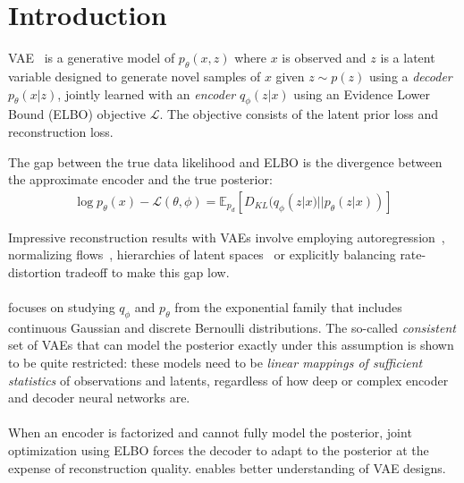 \section{Introduction}

VAE~\cite{vae} is a generative model of $p_\theta(x,z)$ where $x$ is observed and $z$ is a latent variable designed to generate novel samples of $x$ given $z \sim p(z)$ using a \textit{decoder} $p_\theta(x|z)$, jointly learned with an \textit{encoder} $q_\phi(z|x)$ using an Evidence Lower Bound (ELBO) objective $\mathcal{L}$. The objective consists of the latent prior loss and reconstruction loss.

The gap between the true data likelihood and ELBO is the divergence between the approximate encoder and the true posterior:
\begin{align}
\log p_\theta(x) - \mathcal{L}(\theta, \phi) = \mathbb{E}_{p_{d}}[D_{KL}(q_{\phi}(z|x)||p_{\theta}(z|x))]
\end{align}

Impressive reconstruction results with VAEs involve employing autoregression~\cite{Kingma2016ImprovedVI}, normalizing flows~\cite{JimenezRezende2015VariationalIW}, hierarchies of latent spaces~\cite{Vahdat2020NVAEAD} or explicitly balancing rate-distortion tradeoff \cite{bae2023multirate} to make this gap low.

\paragraph{} \cite{shekhovtsov2022vae} focuses on studying $q_\phi$ and $p_\theta$ from the exponential family that includes continuous Gaussian and discrete Bernoulli distributions. The so-called \textit{consistent} set of VAEs that can model the posterior exactly under this assumption is shown to be quite restricted: these models need to be \textit{linear mappings of sufficient statistics} of observations and latents, regardless of how deep or complex encoder and decoder neural networks are.

\paragraph{} When an encoder is factorized and cannot fully model the posterior, joint optimization using ELBO forces the decoder to adapt to the posterior at the expense of reconstruction quality. \cite{shekhovtsov2022vae} enables better understanding of VAE designs.

